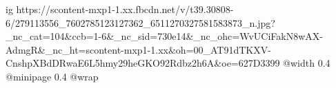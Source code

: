  
 
 
 
 

\ifcmt
  ig https://scontent-mxp1-1.xx.fbcdn.net/v/t39.30808-6/279113556_7602785123127362_6511270327581583873_n.jpg?_nc_cat=104&ccb=1-6&_nc_sid=730e14&_nc_ohc=WvUCiFakN8wAX-AdmgR&_nc_ht=scontent-mxp1-1.xx&oh=00_AT91dTKXV-CnshpXBdDRwaE6L5hmy29heGKO92Rdbz2h6A&oe=627D3399
  @width 0.4
  @minipage 0.4
  @wrap \parpic[r]
\fi
